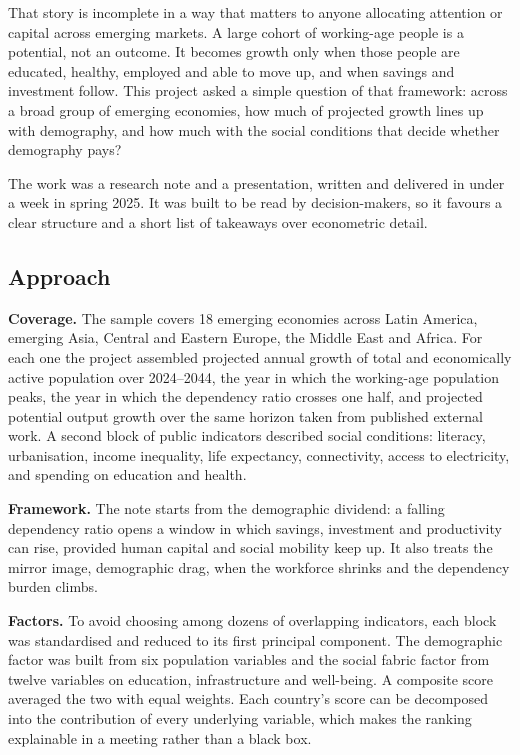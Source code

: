 \documentclass[
  british,
  a4paper,
]{article}
\begin{document}
That story is incomplete in a way that matters to anyone allocating
attention or capital across emerging markets. A large cohort of
working-age people is a potential, not an outcome. It becomes growth
only when those people are educated, healthy, employed and able to move
up, and when savings and investment follow. This project asked a simple
question of that framework: across a broad group of emerging economies,
how much of projected growth lines up with demography, and how much with
the social conditions that decide whether demography pays?

The work was a research note and a presentation, written and delivered
in under a week in spring 2025. It was built to be read by
decision-makers, so it favours a clear structure and a short list of
takeaways over econometric detail.

\subsection{Approach}\label{approach}

\textbf{Coverage.} The sample covers 18 emerging economies across Latin
America, emerging Asia, Central and Eastern Europe, the Middle East and
Africa. For each one the project assembled projected annual growth of
total and economically active population over 2024--2044, the year in
which the working-age population peaks, the year in which the dependency
ratio crosses one half, and projected potential output growth over the
same horizon taken from published external work. A second block of
public indicators described social conditions: literacy, urbanisation,
income inequality, life expectancy, connectivity, access to electricity,
and spending on education and health.

\textbf{Framework.} The note starts from the demographic dividend: a
falling dependency ratio opens a window in which savings, investment and
productivity can rise, provided human capital and social mobility keep
up. It also treats the mirror image, demographic drag, when the
workforce shrinks and the dependency burden climbs.

\textbf{Factors.} To avoid choosing among dozens of overlapping
indicators, each block was standardised and reduced to its first
principal component. The demographic factor was built from six
population variables and the social fabric factor from twelve variables
on education, infrastructure and well-being. A composite score averaged
the two with equal weights. Each country's score can be decomposed into
the contribution of every underlying variable, which makes the ranking
explainable in a meeting rather than a black box.
\end{document}
